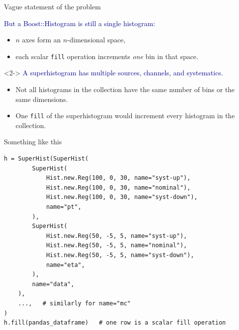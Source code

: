 \documentclass[aspectratio=169]{beamer}
\begin{document}
\begin{frame}{Vague statement of the problem}
\vspace{0.5 cm}
\Large

\textcolor{darkblue}{But a Boost::Histogram is still a single histogram:}

\vspace{0.25 cm}
\begin{itemize}
\item $n$ axes form an $n$-dimensional space,
\item each scalar \texttt{fill} operation increments {\it one} bin in that space.
\end{itemize}

\vspace{0.75 cm}
\begin{uncoverenv}<2->
\textcolor{darkblue}{A superhistogram has multiple sources, channels, and systematics.}

\vspace{0.25 cm}
\begin{itemize}
\item Not all histograms in the collection have the same number of bins or the same dimensions.
\item One \texttt{fill} of the superhistogram would increment every histogram in the collection.
\end{itemize}
\end{uncoverenv}
\end{frame}

\begin{frame}[fragile]{Something like this}
\vspace{0.15 cm}
\small
\begin{verbatim}
h = SuperHist(SuperHist(
        SuperHist(
            Hist.new.Reg(100, 0, 30, name="syst-up"),
            Hist.new.Reg(100, 0, 30, name="nominal"),
            Hist.new.Reg(100, 0, 30, name="syst-down"),
            name="pt",
        ),
        SuperHist(
            Hist.new.Reg(50, -5, 5, name="syst-up"),
            Hist.new.Reg(50, -5, 5, name="nominal"),
            Hist.new.Reg(50, -5, 5, name="syst-down"),
            name="eta",
        ),
        name="data",
    ),
    ...,   # similarly for name="mc"
)
h.fill(pandas_dataframe)   # one row is a scalar fill operation
\end{verbatim}
\end{frame}
\end{document}
